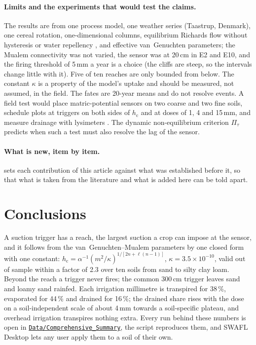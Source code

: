 \documentclass[preprint,12pt,authoryear]{elsarticle}
\newcommand{\csurl}{https://github.com/halilunaziru73-creator/Coupled-Water-Fluxes-Pore-Scale-Dynamics-Precision-Irrigation-Mulching-Feedback-Loops/tree/main/Data/Comprehensive_Summary}
\newcommand{\cslink}{\href{\csurl}{\nolinkurl{Data/Comprehensive_Summary}}}
\newcommand{\hc}{h_{\mathrm{c}}}
\begin{document}
\paragraph{Limits and the experiments that would test the claims.}
The results are from one process model, one weather series (Taastrup, Denmark), one cereal rotation, one-dimensional columns, equilibrium Richards flow without hysteresis or water repellency \citep{Elmaloglou2009b,Diamantopoulos2013AWR,Diamantopoulos2013JH}, and effective van~Genuchten parameters; the Mualem connectivity was not varied, the sensor was at 20\,cm in E2 and E10, and the firing threshold of 5\,mm a year is a choice (the cliffs are steep, so the intervals change little with it). Five of ten reaches are only bounded from below. The constant $\kappa$ is a property of the model's uptake and should be measured, not assumed, in the field. The fates are 20-year means and do not resolve events. A field test would place matric-potential sensors on two coarse and two fine soils, schedule plots at triggers on both sides of $\hc$ and at doses of 1, 4 and 15\,mm, and measure drainage with lysimeters \citep{Groh2020}. The dynamic non-equilibrium criterion $\Pi_\tau$ predicts when such a test must also resolve the lag of the sensor.

\paragraph{What is new, item by item.}  sets each contribution of this article against what was established before it, so that what is taken from the literature and what is added here can be told apart.


\section{Conclusions}
A suction trigger has a reach, the largest suction a crop can impose at the sensor, and it follows from the van~Genuchten--Mualem parameters by one closed form with one constant: $\hc=\alpha^{-1}(m^{2}/\kappa)^{1/[2n+\ell(n-1)]}$, $\kappa=3.5\times10^{-10}$, valid out of sample within a factor of 2.3 over ten soils from sand to silty clay loam. Beyond the reach a trigger never fires; the common 300\,cm trigger leaves sand and loamy sand rainfed. Each irrigation millimetre is transpired for 38\,\%, evaporated for 44\,\% and drained for 16\,\%; the drained share rises with the dose on a soil-independent scale of about 4\,mm towards a soil-specific plateau, and overhead irrigation transpires nothing extra. Every run behind these numbers is open in \cslink{}, the script reproduces them, and SWAFL Desktop lets any user apply them to a soil of their own.
\end{document}
